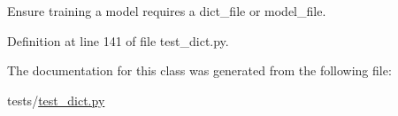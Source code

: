 \begin{DoxyVerb}Ensure training a model requires a dict_file or model_file.\end{DoxyVerb}
 

Definition at line 141 of file test\+\_\+dict.\+py.



The documentation for this class was generated from the following file\+:\begin{DoxyCompactItemize}
\item 
tests/\hyperlink{test__dict_8py}{test\+\_\+dict.\+py}\end{DoxyCompactItemize}
